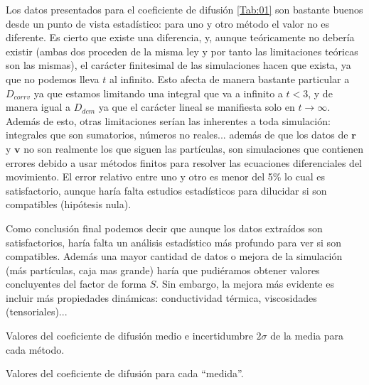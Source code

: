 \documentclass[11pt]{article} %
\newcommand{\rn}{\mathbf{r}}
\newcommand{\vn}{\mathbf{v}}
\begin{document}
Los datos presentados para el coeficiente de difusión \ref{Tab:01} son bastante buenos desde un punto de vista estadístico: para uno y otro método el valor no es diferente. Es cierto que existe una diferencia, y, aunque teóricamente no debería existir (ambas dos proceden de la misma ley y por tanto las limitaciones teóricas son las mismas), el carácter finitesimal de las simulaciones hacen que exista, ya que no podemos lleva $t$ al infinito. Esto afecta de manera bastante particular a $D_{corrv}$ ya que estamos limitando una integral que va a infinito a $t<3$, y de manera igual a $D_{dcm}$ ya que el carácter lineal se manifiesta solo en $t\rightarrow\infty$. Además de esto, otras limitaciones serían las inherentes a toda simulación: integrales que son sumatorios, números no reales... además de que los datos de $\rn$ y $\vn$ no son realmente los que siguen las partículas, son simulaciones que contienen errores debido a usar métodos finitos para resolver las ecuaciones diferenciales del movimiento. El error relativo entre uno y otro es menor del 5\% lo cual es satisfactorio, aunque haría falta estudios estadísticos para dilucidar si son compatibles (hipótesis nula).

Como conclusión final podemos decir que aunque los datos extraídos son satisfactorios, haría falta un análisis estadístico más profundo para ver si son compatibles. Además una mayor cantidad de datos o mejora de la simulación (más partículas, caja mas grande) haría que pudiéramos obtener valores concluyentes del factor de forma $S$. Sin embargo, la mejora más evidente es incluir más propiedades dinámicas: conductividad térmica, viscosidades (tensoriales)...
	
\begin{table}[h!] \centering

\caption{Valores del coeficiente de difusión medio e incertidumbre $2\sigma$ de la media para cada método.}
\label{Tab:01}
\end{table}
\begin{table}[h!] \centering

\caption{Valores del coeficiente de difusión para cada ``medida''.}
\label{Tab:02}
\end{table}




	
	
\end{document}
